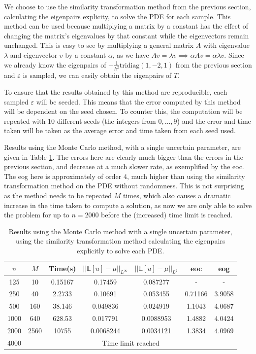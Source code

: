 \documentclass[11pt]{article}
\numberwithin{equation}{section}
\begin{document}
We choose to use the similarity transformation method from the previous section, calculating the eigenpairs explicity, to solve the PDE for each sample. This method can be used because multiplying a matrix by a constant has the effect of changing the matrix's eigenvalues by that constant while the eigenvectors remain unchanged. This is easy to see by multiplying a general matrix $A$ with eigenvalue $\lambda$ and eigenvector $v$ by a constant $\alpha$, as we have $Av = \lambda v \implies \alpha A v = \alpha \lambda v$. Since we already know the eigenpairs of $-\frac{1}{h^2} \text{tridiag}(1,-2,1)$ from the previous section and $\varepsilon$ is sampled, we can easily obtain the eigenpairs of $T$. 

To ensure that the results obtained by this method are reproducible, each sampled $\varepsilon$ will be seeded. This means that the error computed by this method will be dependent on the seed chosen. To counter this, the computation will be repeated with 10 different seeds (the integers from $0, \dots, 9$) and the error and time taken will be taken as the average error and time taken from each seed used.

Results using the Monte Carlo method, with a single uncertain parameter, are given in Table \ref{table:monte carlo}. The errors here are clearly much bigger than the errors in the previous section, and decrease at a much slower rate, as exemplified by the eoc. The eog here is approximately of order 4, much higher than using the similarity transformation method on the PDE without randomness. This is not surprising as the method needs to be repeated $M$ times, which also causes a dramatic increase in the time taken to compute a solution, as now we are only able to solve the problem for up to $n=2000$ before the (increased) time limit is reached.  
\begin{table}[H]
\centering
\begin{tabular}{|c|c|c|c|c|c|c|}
\hline
$n$ & $M$ & Time(s) & $|| \mathbb{E}[u] - \mu ||_{L^{\infty}}$ & $|| \mathbb{E}[u] - \mu ||_{L^{2}}$ & eoc & eog \\
\hline
125 & 10 & 0.15167 & 0.17459 & 0.087277 & - & - \\
250 & 40 & 2.2733 & 0.10691 & 0.053455 & 0.71166 & 3.9058 \\
500 & 160 & 38.146 & 0.049836 & 0.024919 & 1.1043 & 4.0687 \\
1000 & 640 & 628.53 & 0.017791 & 0.0088953 & 1.4882 & 4.0424 \\
2000 & 2560 & 10755 & 0.0068244 & 0.0034121 & 1.3834 & 4.0969 \\
\cline{2-7}
4000 & \multicolumn{6}{c|}{Time limit reached} \\
\hline
\end{tabular}
\captionsetup{justification=centering}
\caption{Results using the Monte Carlo method with a single uncertain parameter, using the similarity transformation method calculating the eigenpairs explicitly to solve each PDE.}
\label{table:monte carlo}
\end{table}
\end{document}
